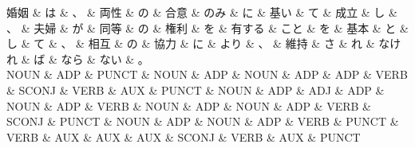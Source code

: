 \documentclass[tikz,border=5pt]{standalone}
\begin{document}
\small
\begin{dependency}[edge unit distance=10.9pt]
    \begin{deptext}[column sep=0.5em]
        婚姻 \& は \& 、 \& 両性 \& の \& 合意 \& のみ \& に \& 基い \& て \& 成立 \& し \& 、 \& 夫婦 \& が \& 同等 \& の \& 権利 \& を \& 有する \& こと \& を \& 基本 \& と \& し \& て \& 、 \& 相互 \& の \& 協力 \& に \& より \& 、 \& 維持 \& さ \& れ \& なけれ \& ば \& なら \& ない \& 。\\
        NOUN \& ADP \& PUNCT \& NOUN \& ADP \& NOUN \& ADP \& ADP \& VERB \& SCONJ \& VERB \& AUX \& PUNCT \& NOUN \& ADP \& ADJ \& ADP \& NOUN \& ADP \& VERB \& NOUN \& ADP \& NOUN \& ADP \& VERB \& SCONJ \& PUNCT \& NOUN \& ADP \& NOUN \& ADP \& VERB \& PUNCT \& VERB \& AUX \& AUX \& AUX \& SCONJ \& VERB \& AUX \& PUNCT\\
    \end{deptext}
\end{dependency}
\end{document}
